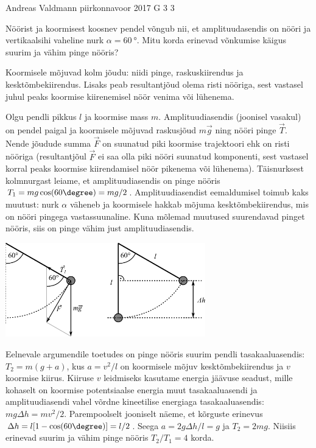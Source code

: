 {Andreas Valdmann} %
{piirkonnavoor} %
{2017} %
{G 3} %
{3} %
{
\ifStatement
Nöörist ja koormisest koosnev pendel võngub nii, et amplituudasendis on nööri ja vertikaalsihi vaheline nurk $\alpha=\SI{60}{\degree}$. Mitu korda erinevad võnkumise käigus suurim ja vähim pinge nööris?
\fi


\ifHint
Koormisele mõjuvad kolm jõudu: niidi pinge, raskuskiirendus ja kesktõmbekiirendus. Lisaks peab resultantjõud olema risti nööriga, sest vastasel juhul peaks koormise kiirenemisel nöör venima või lühenema.
\fi


\ifSolution
Olgu pendli pikkus $l$ ja koormise mass $m$. Amplituudiasendis (joonisel vasakul) on pendel paigal ja koormisele mõjuvad raskusjõud $m\vec{g}$ ning nööri pinge $\vec{T}$. Nende jõudude summa $\vec{F}$ on suunatud piki koormise trajektoori ehk on risti nööriga (resultantjõul $\vec{F}$ ei saa olla piki nööri suunatud komponenti, sest vastasel korral peaks koormise kiirendamisel nöör pikenema või lühenema). Täisnurksest kolmnurgast leiame, et amplituudiasendis on pinge nööris $T_1 = mg\cos(60\degree) = mg / 2$. Amplituudiasendist eemaldumisel toimub kaks muutust: nurk $\alpha$ väheneb ja koormisele hakkab mõjuma kesktõmbekiirendus, mis on nööri pingega vastassuunaline. Kuna mõlemad muutused suurendavad pinget nööris, siis on pinge vähim just amplituudiasendis.

\begin{center}
	\vspace{-10pt}
	\includegraphics[width=0.65\textwidth]{2017-v2g-03-pendel-joonis.pdf}
	\vspace{-15pt}
\end{center}

Eelnevale argumendile toetudes on pinge nööris suurim pendli tasakaaluasendis: $T_2 = m(g + a)$, kus $a = v^2 / l$ on koormisele mõjuv kesktõmbekiirendus ja $v$ koormise kiirus. Kiiruse $v$ leidmiseks kasutame energia jäävuse seadust, mille kohaselt on koormise potentsiaalse energia muut tasakaaluasendi ja amplituudiasendi vahel võrdne kineetilise energiaga tasakaaluasendis: $mg\Delta h = mv^2 / 2$. Parempoolselt jooniselt näeme, et kõrguste erinevus $\Delta h = l[1-\cos(60\degree)] = l / 2$. Seega $a = 2g\Delta h / l = g$ ja $T_2 = 2mg$. Niisiis erinevad suurim ja vähim pinge nööris $T_2 / T_1 = 4$ korda.
\fi


}
